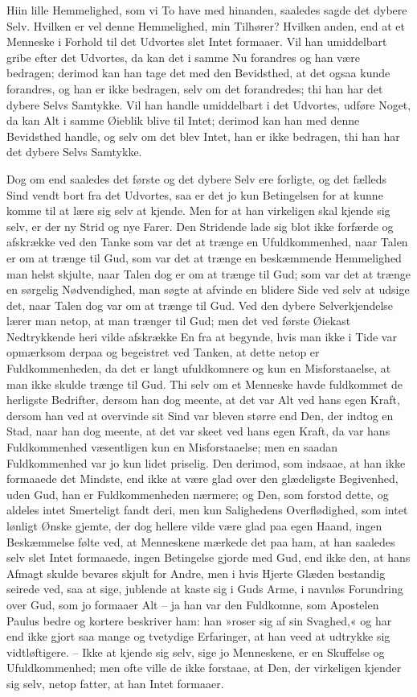 \documentclass[12pt,a4paper]{article}
\begin{document}
Hiin lille Hemmelighed, som vi To have med hinanden, saaledes sagde det dybere Selv. Hvilken er vel denne Hemmelighed, min Tilhører? Hvilken anden, end at et Menneske i Forhold til det Udvortes slet Intet formaaer. Vil han umiddelbart gribe efter det Udvortes, da kan det i samme Nu forandres og han være bedragen; derimod kan han tage det med den Bevidsthed, at det ogsaa kunde forandres, og han er ikke bedragen, selv om det forandredes; thi han har det dybere Selvs Samtykke. Vil han handle umiddelbart i det Udvortes, udføre Noget, da kan Alt i samme Øieblik blive til Intet; derimod kan han med denne Bevidsthed handle, og selv om det blev Intet, han er ikke bedragen, thi han har det dybere Selvs Samtykke.

Dog om end saaledes det første og det dybere Selv ere forligte, og det fælleds Sind vendt bort fra det Udvortes, saa er det jo kun Betingelsen for at kunne komme til at lære sig selv at kjende. Men for at han virkeligen skal kjende sig selv, er der ny Strid og nye Farer. Den Stridende lade sig blot ikke forfærde og afskrække ved den Tanke som var det at trænge en Ufuldkommenhed, naar Talen er om at trænge til Gud, som var det at trænge en beskæmmende Hemmelighed man helst skjulte, naar Talen dog er om at trænge til Gud; som var det at trænge en sørgelig Nødvendighed, man søgte at afvinde en blidere Side ved selv at udsige det, naar Talen dog var om at trænge til Gud. Ved den dybere Selverkjendelse lærer man netop, at man trænger til Gud; men det ved første Øiekast Nedtrykkende heri vilde afskrække En fra at begynde, hvis man ikke i Tide var opmærksom derpaa og begeistret ved Tanken, at dette netop er Fuldkommenheden, da det er langt ufuldkomnere og kun en Misforstaaelse, at man ikke skulde trænge til Gud. Thi selv om et Menneske havde fuldkommet de herligste Bedrifter, dersom han dog meente, at det var Alt ved hans egen Kraft, dersom han ved at overvinde sit Sind var bleven større end Den, der indtog en Stad, naar han dog meente, at det var skeet ved hans egen Kraft, da var hans Fuldkommenhed væsentligen kun en Misforstaaelse; men en saadan Fuldkommenhed var jo kun lidet priselig. Den derimod, som indsaae, at han ikke formaaede det Mindste, end ikke at være glad over den glædeligste Begivenhed, uden Gud, han er Fuldkommenheden nærmere; og Den, som forstod dette, og aldeles intet Smerteligt fandt deri, men kun Salighedens Overflødighed, som intet lønligt Ønske gjemte, der dog hellere vilde være glad paa egen Haand, ingen Beskæmmelse følte ved, at Menneskene mærkede det paa ham, at han saaledes selv slet Intet formaaede, ingen Betingelse gjorde med Gud, end ikke den, at hans Afmagt skulde bevares skjult for Andre, men i hvis Hjerte Glæden bestandig seirede ved, saa at sige, jublende at kaste sig i Guds Arme, i navnløs Forundring over Gud, som jo formaaer Alt – ja han var den Fuldkomne, som Apostelen Paulus bedre og kortere beskriver ham: han »roser sig af sin Svaghed,« og har end ikke gjort saa mange og tvetydige Erfaringer, at han veed at udtrykke sig vidtløftigere. – Ikke at kjende sig selv, sige jo Menneskene, er en Skuffelse og Ufuldkommenhed; men ofte ville de ikke forstaae, at Den, der virkeligen kjender sig selv, netop fatter, at han Intet formaaer.
\end{document}
